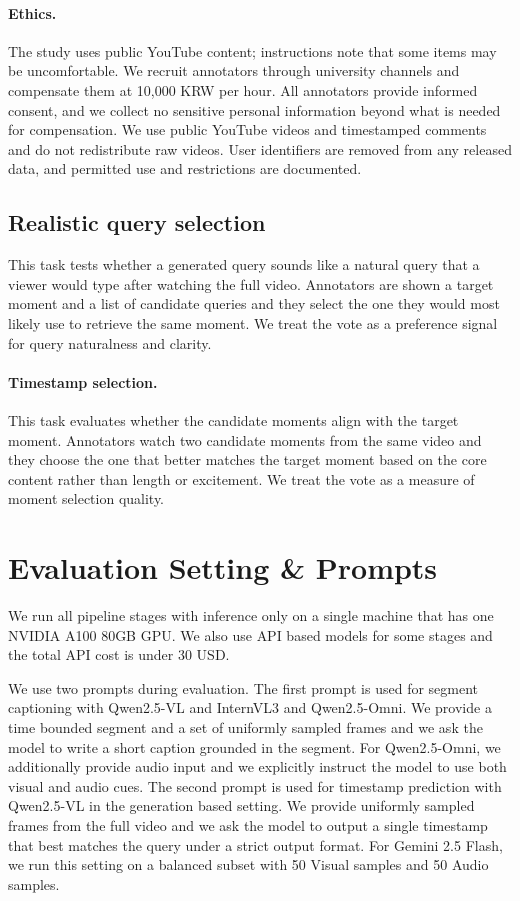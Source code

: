 \documentclass[11pt]{article}
\begin{document}
\paragraph{Ethics.}
The study uses public YouTube content; instructions note that some items may be uncomfortable.
We recruit annotators through university channels and compensate them at 10{,}000 KRW per hour.
All annotators provide informed consent, and we collect no sensitive personal information beyond what is needed for compensation.
We use public YouTube videos and timestamped comments and do not redistribute raw videos.
User identifiers are removed from any released data, and permitted use and restrictions are documented.


\subsection{Realistic query selection}
This task tests whether a generated query sounds like a natural query that a viewer would type after watching the full video.
Annotators are shown a target moment and a list of candidate queries and they select the one they would most likely use to retrieve the same moment.
We treat the vote as a preference signal for query naturalness and clarity.


\paragraph{Timestamp selection.}
This task evaluates whether the candidate moments align with the target moment. Annotators watch two candidate moments from the same video and they choose the one that better matches the target moment based on the core content rather than length or excitement. We treat the vote as a measure of moment selection quality.


\section{Evaluation Setting \& Prompts}
We run all pipeline stages with inference only on a single machine that has one NVIDIA A100 80GB GPU. We also use API based models for some stages and the total API cost is under 30 USD.

We use two prompts during evaluation. The first prompt is used for segment captioning with Qwen2.5-VL and InternVL3 and Qwen2.5-Omni. We provide a time bounded segment and a set of uniformly sampled frames and we ask the model to write a short caption grounded in the segment. For Qwen2.5-Omni, we additionally provide audio input and we explicitly instruct the model to use both visual and audio cues. The second prompt is used for timestamp prediction with Qwen2.5-VL in the generation based setting. We provide uniformly sampled frames from the full video and we ask the model to output a single timestamp that best matches the query under a strict output format. For Gemini 2.5 Flash, we run this setting on a balanced subset with 50 Visual samples and 50 Audio samples.


\end{document}
